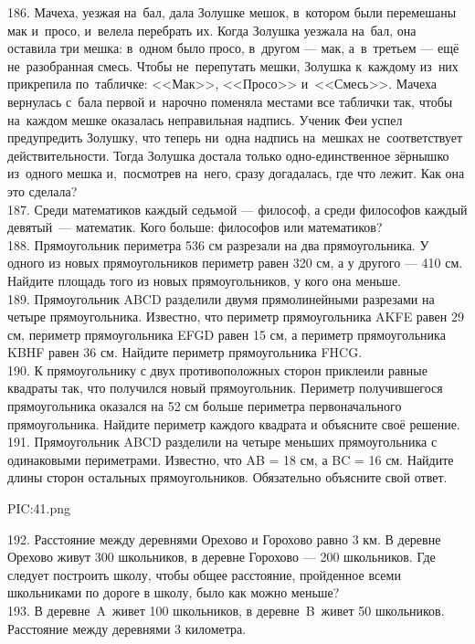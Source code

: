 186. Мачеха, уезжая на бал, дала Золушке мешок, в котором были перемешаны мак и просо, и велела перебрать их. Когда Золушка уезжала на бал, она оставила три мешка: в одном было просо, в другом --- мак, а в третьем --- ещё не разобранная смесь. Чтобы не перепутать мешки, Золушка к каждому из них прикрепила по табличке: <<Мак>>, <<Просо>> и <<Смесь>>. Мачеха вернулась с бала первой и нарочно поменяла местами все таблички так, чтобы на каждом мешке оказалась неправильная надпись. Ученик Феи успел предупредить Золушку, что теперь ни одна надпись на мешках не соответствует действительности. Тогда Золушка достала только одно-единственное зёрнышко из одного мешка и, посмотрев на него, сразу догадалась, где что лежит. Как она это сделала?\\
187. Среди математиков каждый седьмой --- философ, а среди философов каждый девятый --- математик. Кого больше: философов или математиков?\\
188. Прямоугольник периметра 536 см разрезали на два прямоугольника. У одного из новых прямоугольников периметр равен 320 см, а у другого --- 410 см. Найдите площадь того из новых прямоугольников, у кого она меньше.\\
189. Прямоугольник ABCD разделили двумя прямолинейными разрезами на четыре прямоугольника. Известно, что периметр прямоугольника AKFE равен 29 см, периметр прямоугольника EFGD равен 15 см,  а периметр прямоугольника KBHF равен 36 см. Найдите периметр прямоугольника FHCG.\\
190.  К прямоугольнику с двух противоположных сторон приклеили равные квадраты так, что получился новый прямоугольник. Периметр получившегося прямоугольника оказался на 52 см больше периметра первоначального прямоугольника. Найдите периметр каждого квадрата и объясните своё решение.\\
191. Прямоугольник ABCD разделили на четыре меньших прямоугольника с одинаковыми периметрами. Известно, что AB = 18 см, а BC = 16 см. Найдите длины сторон остальных прямоугольников. Обязательно объясните свой ответ.
\begin{center}
{{PIC:41.png}}
\end{center}
192. Расстояние между деревнями Орехово и Горохово равно 3 км. В деревне Орехово живут 300 школьников, в деревне Горохово --- 200 школьников. Где следует построить школу, чтобы общее расстояние, пройденное всеми школьниками по дороге в школу, было как можно меньше?\\
193. В деревне A живет 100 школьников, в деревне B живет 50 школьников. Расстояние между деревнями 3 километра. 

